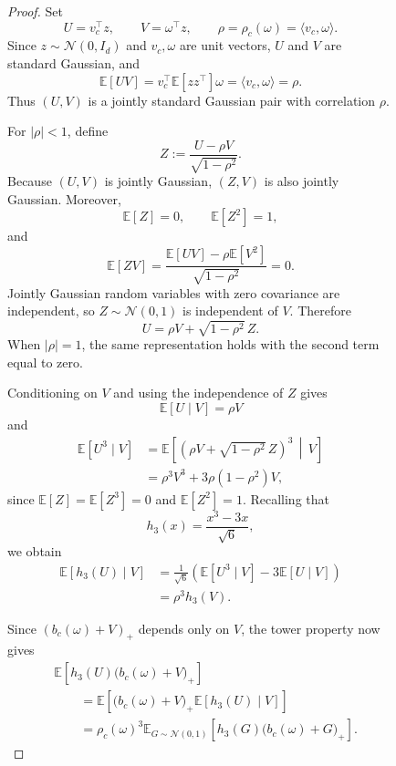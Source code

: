 \documentclass{article}
\begin{document}
\begin{figure}
\begin{proof}
Set
\[
    U=v_c^\top z,
    \qquad
    V=\omega^\top z,
    \qquad
    \rho=\rho_c(\omega)
    =\langle v_c,\omega\rangle.
\]
Since $z\sim\mathcal N(0,I_d)$ and
$v_c,\omega$ are unit vectors,
$U$ and $V$ are standard Gaussian, and
\[
    \mathbb E[UV]
    =
    v_c^\top
      \mathbb E[zz^\top]\omega
    =
    \langle v_c,\omega\rangle
    =
    \rho.
\]
Thus $(U,V)$ is a jointly standard Gaussian pair with correlation $\rho$.

For $|\rho|<1$, define
\[
    Z:=\frac{U-\rho V}{\sqrt{1-\rho^2}}.
\]
Because $(U,V)$ is jointly Gaussian, $(Z,V)$ is also jointly Gaussian.
Moreover,
\[
    \mathbb E[Z]=0,
    \qquad
    \mathbb E[Z^2]=1,
\]
and
\[
    \mathbb E[ZV]
    =
    \frac{\mathbb E[UV]-\rho\mathbb E[V^2]}
         {\sqrt{1-\rho^2}}
    =0.
\]
Jointly Gaussian random variables with zero covariance are independent, so
$Z\sim\mathcal N(0,1)$ is independent of $V$. Therefore
\[
    U=\rho V+\sqrt{1-\rho^2}\,Z.
\]
When $|\rho|=1$, the same representation holds with the second term equal
to zero.

Conditioning on $V$ and using the independence of $Z$ gives
\[
    \mathbb E[U\mid V]=\rho V
\]
and
\begin{align*}
    \mathbb E[U^3\mid V]
    &=
    \mathbb E\left[
        \left(\rho V+\sqrt{1-\rho^2}\,Z\right)^3
        \,\middle|\,V
    \right]\\
    &=
    \rho^3V^3+3\rho(1-\rho^2)V,
\end{align*}
since $\mathbb E[Z]=\mathbb E[Z^3]=0$ and $\mathbb E[Z^2]=1$.
Recalling that
\[
    h_3(x)=\frac{x^3-3x}{\sqrt6},
\]
we obtain
\begin{align*}
    \mathbb E[h_3(U)\mid V]
    &=
    \frac{1}{\sqrt6}
    \left(
        \mathbb E[U^3\mid V]
        -3\mathbb E[U\mid V]
    \right)\\
    &=
    \rho^3 h_3(V).
\end{align*}

Since $(b_c(\omega)+V)_+$ depends only on $V$, the tower property now gives
\begin{align*}
    &\mathbb E\left[
        h_3(U)\bigl(b_c(\omega)+V\bigr)_+
    \right]\\
    &\qquad=
    \mathbb E\left[
        \bigl(b_c(\omega)+V\bigr)_+
        \mathbb E[h_3(U)\mid V]
    \right]\\
    &\qquad=
    \rho_c(\omega)^3
    \mathbb E_{G\sim\mathcal N(0,1)}
    \left[
        h_3(G)\bigl(b_c(\omega)+G\bigr)_+
    \right].
\end{align*}


\end{proof}
\end{figure}
\end{document}

